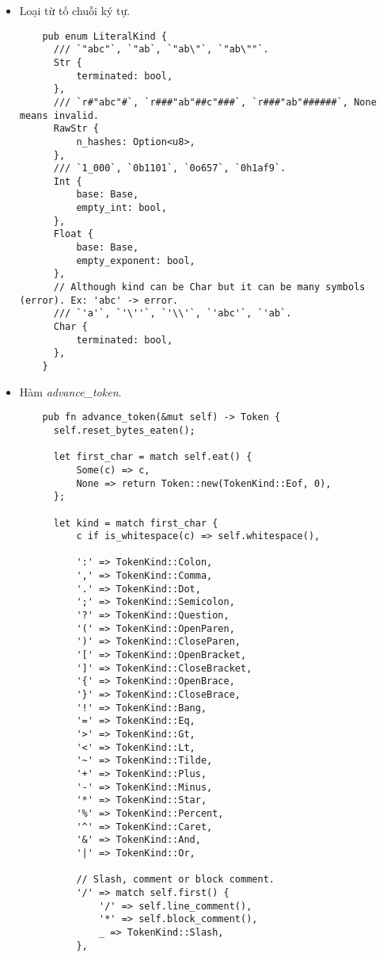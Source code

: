 {\begin{itemize}
\begin{lstlisting}[]
      /// End of input.
      Eof,
    }
  \end{lstlisting}
  \item \label{ap1:simple_token_literal}Loại từ tố chuỗi ký tự. %
  \begin{lstlisting}
    pub enum LiteralKind {
      /// `"abc"`, `"ab`, `"ab\"`, `"ab\""`.
      Str {
          terminated: bool,
      },
      /// `r#"abc"#`, `r###"ab"##c"###`, `r###"ab"######`, None means invalid.
      RawStr {
          n_hashes: Option<u8>,
      },
      /// `1_000`, `0b1101`, `0o657`, `0h1af9`.
      Int {
          base: Base,
          empty_int: bool,
      },
      Float {
          base: Base,
          empty_exponent: bool,
      },
      // Although kind can be Char but it can be many symbols (error). Ex: 'abc' -> error.
      /// `'a'`, `'\''`, `'\\'`, `'abc'`, `'ab`.
      Char {
          terminated: bool,
      },
    }
  \end{lstlisting}
  \item \label{ap1:simple_token_advance_token}Hàm \textit{advance\_token}. %
  \begin{lstlisting}
    pub fn advance_token(&mut self) -> Token {
      self.reset_bytes_eaten();

      let first_char = match self.eat() {
          Some(c) => c,
          None => return Token::new(TokenKind::Eof, 0),
      };

      let kind = match first_char {
          c if is_whitespace(c) => self.whitespace(),

          ':' => TokenKind::Colon,
          ',' => TokenKind::Comma,
          '.' => TokenKind::Dot,
          ';' => TokenKind::Semicolon,
          '?' => TokenKind::Question,
          '(' => TokenKind::OpenParen,
          ')' => TokenKind::CloseParen,
          '[' => TokenKind::OpenBracket,
          ']' => TokenKind::CloseBracket,
          '{' => TokenKind::OpenBrace,
          '}' => TokenKind::CloseBrace,
          '!' => TokenKind::Bang,
          '=' => TokenKind::Eq,
          '>' => TokenKind::Gt,
          '<' => TokenKind::Lt,
          '~' => TokenKind::Tilde,
          '+' => TokenKind::Plus,
          '-' => TokenKind::Minus,
          '*' => TokenKind::Star,
          '%' => TokenKind::Percent,
          '^' => TokenKind::Caret,
          '&' => TokenKind::And,
          '|' => TokenKind::Or,

          // Slash, comment or block comment.
          '/' => match self.first() {
              '/' => self.line_comment(),
              '*' => self.block_comment(),
              _ => TokenKind::Slash,
          },


\end{lstlisting}
\end{itemize}}
